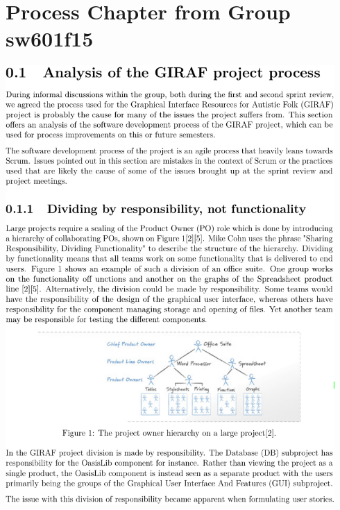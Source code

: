 \chapter{Process Chapter from Group sw601f15}\label{app:601}

\includegraphics[page=1,width=0.94\textwidth]{part_appendix/sw601f15.pdf}\clearpage{}
